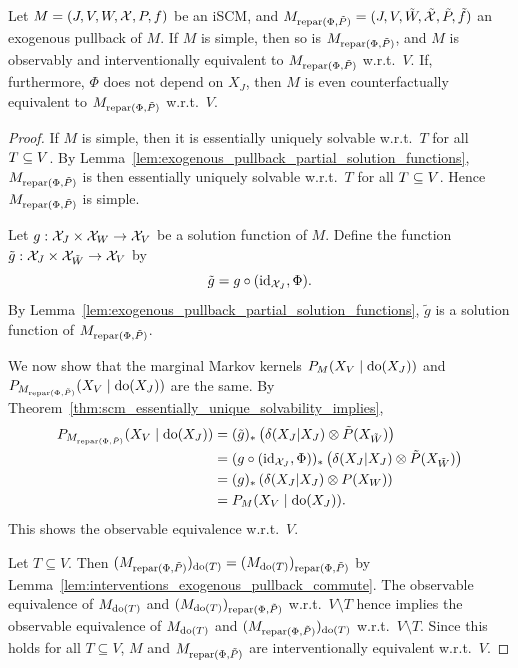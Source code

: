 \begin{Thm}\label{thm:various_equiv_exogenous_pullback}
  Let $M = \left ( J, V, W, \mathcal{X}, P, f \right )$ be an iSCM, and $M_{\mathrm{repar}({\Phi},{\tilde{P}})} = ( J, V, \tilde{W}, \tilde{\mathcal{X}}, \tilde{P}, \tilde{f} )$ an exogenous pullback of $M$.
  If $M$ is simple, then so is $M_{\mathrm{repar}({\Phi},{\tilde{P}})}$, and $M$ is observably and interventionally equivalent to $M_{\mathrm{repar}({\Phi},{\tilde{P}})}$ w.r.t.\ $V$.
  If, furthermore, $\Phi$ does not depend on $X_J$, then $M$ is even counterfactually equivalent to $M_{\mathrm{repar}({\Phi},{\tilde{P}})}$ w.r.t.\ $V$.
\end{Thm}
\begin{proof}
  If $M$ is simple, then it is essentially uniquely solvable w.r.t.\ $T$ for all $T \subseteq V$.
  By Lemma~\ref{lem:exogenous_pullback_partial_solution_functions}, $M_{\mathrm{repar}({\Phi},{\tilde{P}})}$ is then essentially uniquely solvable w.r.t.\ $T$ for all $T \subseteq V$.
  Hence $M_{\mathrm{repar}({\Phi},{\tilde{P}})}$ is simple.

  Let $g : \mathcal{X}_J \times \mathcal{X}_W \to \mathcal{X}_V$ be a solution function of $M$. 
  Define the function $\tilde{g} : \mathcal{X}_J \times \mathcal{X}_{\tilde{W}} \to \mathcal{X}_V$ by
  $$\tilde g = g \circ (\mathrm{id}_{\mathcal{X}_J},\Phi).$$
  By Lemma~\ref{lem:exogenous_pullback_partial_solution_functions}, $\tilde{g}$ is a solution function of $M_{\mathrm{repar}({\Phi},{\tilde{P}})}$.

  We now show that the marginal Markov kernels $P_{M}(X_V \mid \operatorname{do}(X_J))$ and $P_{M_{\mathrm{repar}({\Phi},{\tilde{P}})}}(X_V \mid \operatorname{do}(X_J))$ are the same.
  By Theorem~\ref{thm:scm_essentially_unique_solvability_implies}, 
  \begin{align*}
    P_{M_{\mathrm{repar}({\Phi},{\tilde{P}})}}(X_V \mid \operatorname{do}(X_J)) 
    & = (\tilde g)_* \left ( \delta(X_J|X_J) \otimes \tilde{P}(X_{\tilde{W}}) \right ) \\
    & = (g \circ (\mathrm{id}_{\mathcal{X}_J},\Phi))_* \left ( \delta(X_J|X_J) \otimes \tilde{P}(X_{\tilde{W}}) \right ) \\
    & = (g)_* \left ( \delta(X_J|X_J) \otimes P(X_W)  \right ) \\
    & = P_M(X_V \mid \operatorname{do}(X_J)).
  \end{align*}
  This shows the observable equivalence w.r.t.\ $V$.

  Let $T \subseteq V$. 
  Then $(M_{\mathrm{repar}({\Phi},{\tilde{P}})})_{\operatorname{do}(T)} = (M_{\operatorname{do}(T)})_{\mathrm{repar}({\Phi},{\tilde{P}})}$ by Lemma~\ref{lem:interventions_exogenous_pullback_commute}.
  The observable equivalence of $M_{\operatorname{do}(T)}$ and $(M_{\operatorname{do}(T)})_{\mathrm{repar}({\Phi},{\tilde{P}})}$ w.r.t.\ $V \setminus T$ hence implies the observable equivalence of $M_{\operatorname{do}(T)}$ and $(M_{\mathrm{repar}({\Phi},{\tilde{P}})})_{\operatorname{do}(T)}$ w.r.t.\ $V \setminus T$.
  Since this holds for all $T \subseteq V$, $M$ and $M_{\mathrm{repar}({\Phi},{\tilde{P}})}$ are interventionally equivalent w.r.t.\ $V$.


\end{proof}
